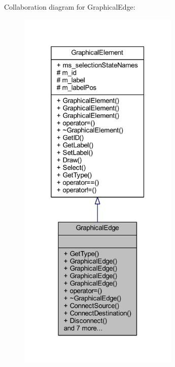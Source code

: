 Collaboration diagram for Graphical\+Edge\+:
\nopagebreak
\begin{figure}[H]
\begin{center}
\leavevmode
\includegraphics[width=217pt]{class_graphical_edge__coll__graph}
\end{center}
\end{figure}
